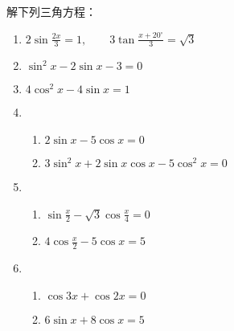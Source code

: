 \begin{ex}
解下列三角方程：
\begin{enumerate}
    \item $2\sin\frac{2x}{3}=1,\qquad 3\tan\frac{x+20^{\circ}}{3}=\sqrt{3}$
    \item $\sin^2x-2\sin x-3=0$
    \item $4\cos^2 x-4\sin x=1$
    \item \begin{enumerate}
        \item $2\sin x-5\cos x=0$
        \item $3\sin^2 x+2\sin x\cos x-5\cos^2 x=0$
    \end{enumerate}
    \item \begin{enumerate}
        \item $\sin\frac{x}{2}-\sqrt{3}\cos\frac{x}{4}=0$
        \item $4\cos\frac{x}{2}-5\cos x=5$
    \end{enumerate}
    \item \begin{enumerate}
        \item $\cos 3x+\cos 2x=0$
        \item $6\sin x+8\cos x=5$
    \end{enumerate}
\end{enumerate}
\end{ex}

